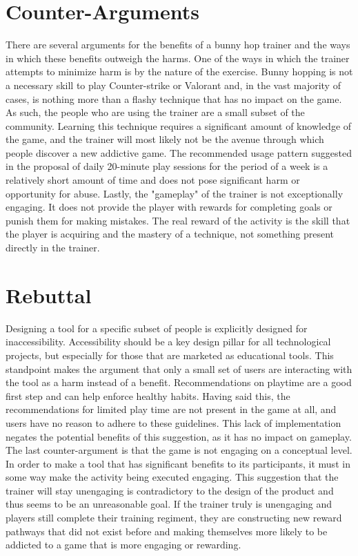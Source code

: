 \documentclass[10pt,twocolumn]{article}
\begin{document}
\section{Counter-Arguments}
There are several arguments for the benefits of a bunny hop trainer and the ways in which these benefits outweigh the harms. One of the ways in which the trainer attempts to minimize harm is by the nature of the exercise. Bunny hopping is not a necessary skill to play Counter-strike or Valorant and, in the vast majority of cases, is nothing more than a flashy technique that has no impact on the game. As such, the people who are using the trainer are a small subset of the community. Learning this technique requires a significant amount of knowledge of the game, and the trainer will most likely not be the avenue through which people discover a new addictive game. The recommended usage pattern suggested in the proposal of daily 20-minute play sessions for the period of a week is a relatively short amount of time and does not pose significant harm or opportunity for abuse. Lastly, the "gameplay" of the trainer is not exceptionally engaging. It does not provide the player with rewards for completing goals or punish them for making mistakes. The real reward of the activity is the skill that the player is acquiring and the mastery of a technique, not something present directly in the trainer.

\section{Rebuttal}
Designing a tool for a specific subset of people is explicitly designed for inaccessibility. Accessibility should be a key design pillar for all technological projects, but especially for those that are marketed as educational tools. This standpoint makes the argument that only a small set of users are interacting with the tool as a harm instead of a benefit. Recommendations on playtime are a good first step and can help enforce healthy habits. Having said this, the recommendations for limited play time are not present in the game at all, and users have no reason to adhere to these guidelines. This lack of implementation negates the potential benefits of this suggestion, as it has no impact on gameplay. The last counter-argument is that the game is not engaging on a conceptual level. In order to make a tool that has significant benefits to its participants, it must in some way make the activity being executed engaging. This suggestion that the trainer will stay unengaging is contradictory to the design of the product and thus seems to be an unreasonable goal. If the trainer truly is unengaging and players still complete their training regiment, they are constructing new reward pathways that did not exist before and making themselves more likely to be addicted to a game that is more engaging or rewarding.
\end{document}
